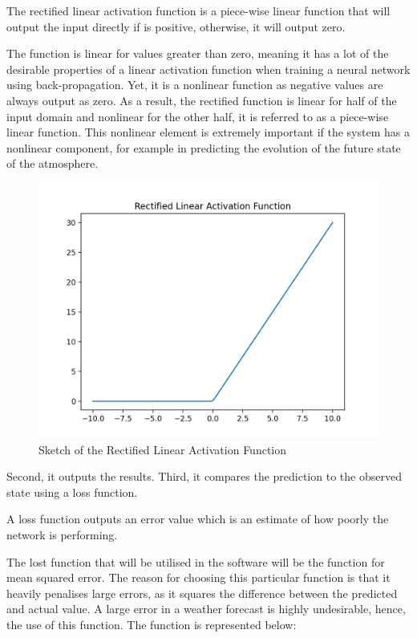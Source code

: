 \begin{definition}
The rectified linear activation function is a piece-wise linear function that will output the input directly if is positive, otherwise, it will output zero.
\end{definition}

The function is linear for values greater than zero, meaning it has a lot of the desirable properties of a linear activation function when training a neural network using back-propagation. Yet, it is a nonlinear function as negative values are always output as zero. As a result, the rectified function is linear for half of the input domain and nonlinear for the other half, it is referred to as a piece-wise linear function\cite{relu}. This nonlinear element is extremely important if the system has a nonlinear component, for example in predicting the evolution of the future state of the atmosphere.

\begin{figure}[H]
    \centering
    \includegraphics[width=.65\linewidth]{Images/relu.png}
    \caption{Sketch of the Rectified Linear Activation Function}
\end{figure}

Second, it outputs the results. Third, it compares the prediction to the observed state using a loss function.

\begin{definition}
A loss function outputs an error value which is an estimate of how poorly the network is performing.
\end{definition}

The lost function that will be utilised in the software will be the function for mean squared error. The reason for choosing this particular function is that it heavily penalises large errors, as it squares the difference between the predicted and actual value. A large error in a weather forecast is highly undesirable, hence, the use of this function. The function is represented below:

